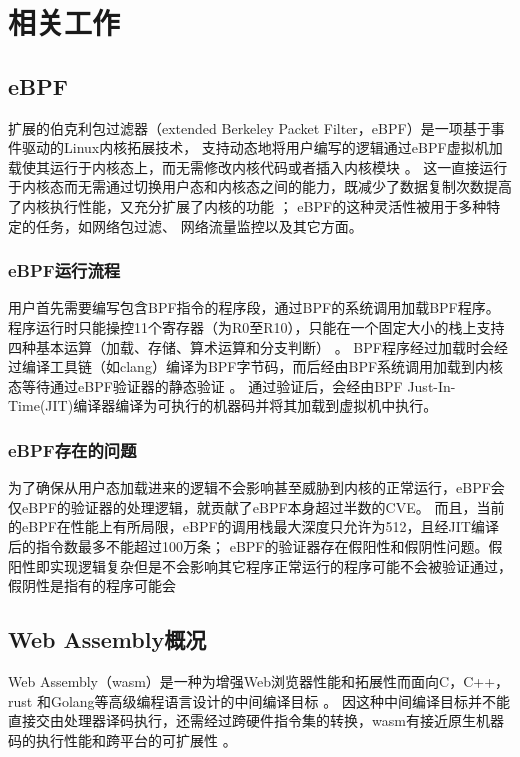 \section{相关工作}
\label{section:relatedWork}
\subsection{eBPF}
扩展的伯克利包过滤器（extended Berkeley Packet Filter，eBPF）是一项基于事件驱动的Linux内核拓展技术，\nolinebreak
支持动态地将用户编写的逻辑通过eBPF虚拟机加载使其运行于内核态上，而无需修改内核代码或者插入内核模块\nolinebreak
\cite{sunFindingCorrectnessBugs2024, YIHeCrossContainer}。\nolinebreak
这一直接运行于内核态而无需通过切换用户态和内核态之间的能力，既减少了数据复制次数提高了内核执行性能，又充分扩展了内核的功能\nolinebreak
\cite{YIHeCrossContainer, ZhangZiJunLinuxXiTonge}；\nolinebreak
eBPF的这种灵活性被用于多种特定的任务\cite{HaoValidating}，如网络包过滤\cite{10.1145/3371038, TCPdump}、\nolinebreak
网络流量监控\cite{9110434}以及其它方面\cite{280870, 258973}。\nolinebreak

\subsubsection{eBPF运行流程}
用户首先需要编写包含BPF指令的程序段，通过BPF的系统调用加载BPF程序。程序运行时只能操控11个寄存器（为R0至R10），只能在一个固定大小的栈上支持四种基本运算（加载、存储、算术运算和分支判断）\nolinebreak
\cite{HaoValidating}。\nolinebreak
BPF程序经过加载时会经过编译工具链（如clang）编译为BPF字节码，而后经由BPF系统调用加载到内核态等待通过eBPF验证器的静态验证\nolinebreak
\cite{zhengBpftimeUserspaceEBPF2023}。\nolinebreak
通过验证后，会经由BPF Just-In-Time(JIT)编译器编译为可执行的机器码并将其加载到虚拟机中执行。

\subsubsection{eBPF存在的问题}
为了确保从用户态加载进来的逻辑不会影响甚至威胁到内核的正常运行，eBPF会
仅eBPF的验证器的处理逻辑，就贡献了eBPF本身超过半数的CVE\cite{hive}。\nolinebreak
而且，当前的eBPF在性能上有所局限，eBPF的调用栈最大深度只允许为512，且经JIT编译后的指令数最多不能超过100万条；\nolinebreak
eBPF的验证器存在假阳性\cite{hive}和假阴性问题。假阳性即实现逻辑复杂但是不会影响其它程序正常运行的程序可能不会被验证通过，假阴性是指有的程序可能会

\subsection{Web Assembly概况}
Web Assembly（wasm）是一种为增强Web浏览器性能和拓展性而面向C，C++，rust 和Golang等高级编程语言设计的中间编译目标\nolinebreak
\cite{lehmannWasabiFrameworkDynamically2019, lehmannEverythingOldNew, bhansaliFirstLookCode2022, waseemIssuesTheirCauses2024}。\nolinebreak
因这种中间编译目标并不能直接交由处理器译码执行，还需经过跨硬件指令集的转换，wasm有接近原生机器码的执行性能和跨平台的可扩展性\nolinebreak
\cite{lehmannEverythingOldNew, waseemIssuesTheirCauses2024, lehmannWasabiFrameworkDynamically2019, JayProvablySafe}。\nolinebreak
